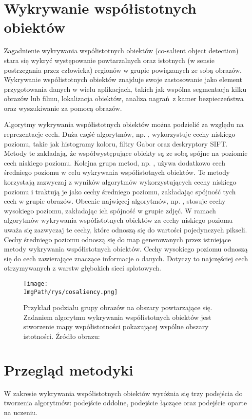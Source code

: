\documentclass[a4paper,12pt,twoside,openany]{report}
\newcommand{\ImgPath}{.}
\begin{document}
	\section{Wykrywanie współistotnych obiektów}
	Zagadnienie wykrywania współistotnych obiektów (co-salient object detection) stara się wykryć występowanie powtarzalnych oraz istotnych (w sensie postrzegania przez człowieka) regionów w grupie powiązanych ze sobą obrazów. Wykrywanie współistotnych obiektów znajduje swoje zastosowanie jako element przygotowania danych w wielu aplikacjach, takich jak wspólna segmentacja kilku obrazów lub filmu, lokalizacja obiektów, analiza nagrań z kamer bezpieczeństwa oraz wyszukiwanie za pomocą obrazów. 

	Algorytmy wykrywania współistotnych obiektów można podzielić za względu na reprezentacje cech. Duża część algorytmów, np. \cite{ChangLL11}, wykorzystuje cechy niskiego poziomu, takie jak histogramy koloru, filtry Gabor oraz deskryptory SIFT. Metody te zakładają, że współwystępujące obiekty są ze sobą spójne na poziomie cech niskiego poziomu. Kolejna grupa metod, np. \cite{midfeatex}, używa dodatkowo cech średniego poziomu w celu wykrywania współistotnych obiektów. Te metody korzystają zazwyczaj z wyników algorytmów wykorzystujących cechy niskiego poziomu i traktują je jako cechy średniego poziomu, zakładając spójność tych cech w grupie obrazów. Obecnie najwięcej algorytmów, np. \cite{highfeatex}, stosuje cechy wysokiego poziomu, zakładając ich spójność w grupie zdjęć. W ramach algorytmów wykrywania współistotnych obiektów za cechy niskiego poziomu uważa się zazwyczaj te cechy, które odnoszą się do wartości pojedynczych pikseli. Cechy średniego poziomu odnoszą się do map generowanych przez istniejące metody wykrywania współistotnych obiektów. Cechy wysokiego poziomu odnoszą się do cech zawierające znaczące informacje o danych. Dotyczy to najczęściej cech otrzymywanych z warstw głębokich sieci splotowych. 
	

	\begin{figure}[h]
		\centering
		\texttt{[image: \\ImgPath/rys/cosaliency.png]}
		\caption{Przykład podziału grupy obrazów na obszary powtarzające się. Zadaniem algorytmu wykrywania współistotnych obiektów jest stworzenie mapy współistotności pokazującej wspólne obszary istotności. Źródło obrazu: \cite{10.1145/3158674}}
		\label{co}
	\end{figure}

	\section{Przegląd metodyki}
	W zakresie wykrywania współistotnych obiektów wyróżnia się trzy podejścia do tworzenia algorytmów: podejście oddolne, podejście łączące oraz podejście oparte na uczeniu.
\end{document}
